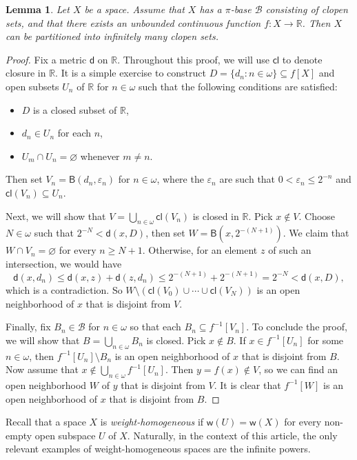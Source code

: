 \documentclass{amsart}
\theoremstyle{plain}
\newtheorem{lemma}[theorem]{Lemma}
\theoremstyle{definition}
\newcommand{\Ball}{\mathsf{B}}
\newcommand{\di}{\mathsf{d}}
\newcommand{\cl}{\mathsf{cl}}
\newcommand{\weight}{\mathsf{w}}
\newcommand{\BB}{\mathcal{B}}
\newcommand{\RRR}{\mathbb{R}}
\begin{document}
\begin{lemma}\label{lemma_pseudocompact}
Let $X$ be a space. Assume that $X$ has a $\pi$-base $\BB$ consisting of clopen sets, and that there exists an unbounded continuous function $f:X\longrightarrow\RRR$. Then $X$ can be partitioned into infinitely many clopen sets.
\end{lemma}
\begin{proof}
Fix a metric $\di$ on $\RRR$. Throughout this proof, we will use $\cl$ to denote closure in $\RRR$. It is a simple exercise to construct $D=\{d_n:n\in\omega\}\subseteq f[X]$ and open subsets $U_n$ of $\RRR$ for $n\in\omega$ such that the following conditions are satisfied:
\begin{itemize}
\item $D$ is a closed subset of $\RRR$,
\item $d_n\in U_n$ for each $n$,
\item $U_m\cap U_n=\varnothing$ whenever $m\neq n$.
\end{itemize}
Then set $V_n=\Ball(d_n,\varepsilon_n)$ for $n\in\omega$, where the $\varepsilon_n$ are such that $0<\varepsilon_n\leq 2^{-n}$ and $\cl(V_n)\subseteq U_n$.

Next, we will show that $V=\bigcup_{n\in\omega}\cl(V_n)$ is closed in $\RRR$. Pick $x\notin V$. Choose $N\in\omega$ such that $2^{-N}<\di(x,D)$, then set $W=\Ball(x,2^{-(N+1)})$. We claim that $W\cap V_n=\varnothing$ for every $n\geq N+1$. Otherwise, for an element $z$ of such an intersection, we would have
$$
\di(x,d_n)\leq\di(x,z)+\di(z,d_n)\leq 2^{-(N+1)}+2^{-(N+1)}=2^{-N}<\di(x,D),
$$
which is a contradiction. So $W\setminus(\cl(V_0)\cup\cdots\cup\cl(V_N))$ is an open neighborhood of $x$ that is disjoint from $V$.

Finally, fix $B_n\in\BB$ for $n\in\omega$ so that each $B_n\subseteq f^{-1}[V_n]$. To conclude the proof, we will show that $B=\bigcup_{n\in\omega}B_n$ is closed. Pick $x\notin B$. If $x\in f^{-1}[U_n]$ for some $n\in\omega$, then $f^{-1}[U_n]\setminus B_n$ is an open neighborhood of $x$ that is disjoint from $B$. Now assume that $x\notin\bigcup_{n\in\omega} f^{-1}[U_n]$. Then $y=f(x)\notin V$, so we can find an open neighborhood $W$ of $y$ that is disjoint from $V$. It is clear that $f^{-1}[W]$ is an open neighborhood of $x$ that is disjoint from $B$.
\end{proof}

Recall that a space $X$ is \emph{weight-homogeneous} if $\weight(U)=\weight(X)$ for every non-empty open subspace $U$ of $X$. Naturally, in the context of this article, the only relevant examples of weight-homogeneous spaces are the infinite powers.
\end{document}
